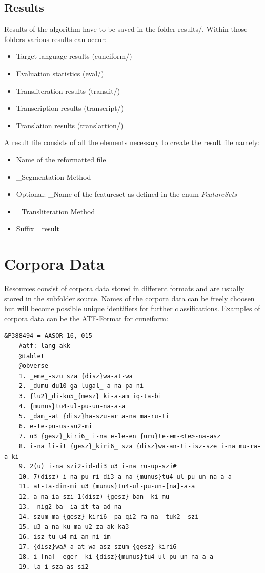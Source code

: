 \documentclass[10pt,a4paper,titlepage]{report}
\begin{document}
	\subsection{Results}
	Results of the algorithm have to be saved in the folder results/. Within those folders various results can occur:
	\begin{itemize}
		\item Target language results (cuneiform/)
		\item Evaluation statistics (eval/)
		\item Transliteration results (translit/)
		\item Transcription results (transcript/)
		\item Translation results (translartion/)
	\end{itemize}
	A result file consists of all the elements necessary to create the result file namely:
	\begin{itemize}
		\item Name of the reformatted file	
		\item \_Segmentation Method
		\item Optional: \_Name of the featureset as defined in the enum \textit{FeatureSets}
		\item \_Transliteration Method
		\item Suffix \_result
	\end{itemize}
	\section{Corpora Data}
	Resources consist of corpora data stored in different formats and are usually stored in the subfolder source.
	Names of the corpora data can be freely choosen but will become possible unique identifiers for further classifications.
	Examples of corpora data can be the ATF-Format for cuneiform:
	\begin{lstlisting}[caption=ATF-Format as Corpus Format]
	&P388494 = AASOR 16, 015
	#atf: lang akk
	@tablet
	@obverse
	1. _eme_-szu sza {disz}wa-at-wa
	2. _dumu du10-ga-lugal_ a-na pa-ni
	3. {lu2}_di-ku5_{mesz} ki-a-am iq-ta-bi
	4. {munus}tu4-ul-pu-un-na-a-a
	5. _dam_-at {disz}ha-szu-ar a-na ma-ru-ti
	6. e-te-pu-us-su2-mi
	7. u3 {gesz}_kiri6_ i-na e-le-en {uru}te-em-<te>-na-asz
	8. i-na li-it {gesz}_kiri6_ sza {disz}wa-an-ti-isz-sze i-na mu-ra-a-ki
	9. 2(u) i-na szi2-id-di3 u3 i-na ru-up-szi#
	10. 7(disz) i-na pu-ri-di3 a-na {munus}tu4-ul-pu-un-na-a-a
	11. at-ta-din-mi u3 {munus}tu4-ul-pu-un-[na]-a-a
	12. a-na ia-szi 1(disz) {gesz}_ban_ ki-mu
	13. _nig2-ba_-ia it-ta-ad-na
	14. szum-ma {gesz}_kiri6_ pa-qi2-ra-na _tuk2_-szi
	15. u3 a-na-ku-ma u2-za-ak-ka3
	16. isz-tu u4-mi an-ni-im
	17. {disz}wa#-a-at-wa asz-szum {gesz}_kiri6_
	18. i-[na] _eger_-ki {disz}{munus}tu4-ul-pu-un-na-a-a
	19. la i-sza-as-si2
	\end{lstlisting}
\end{document}
